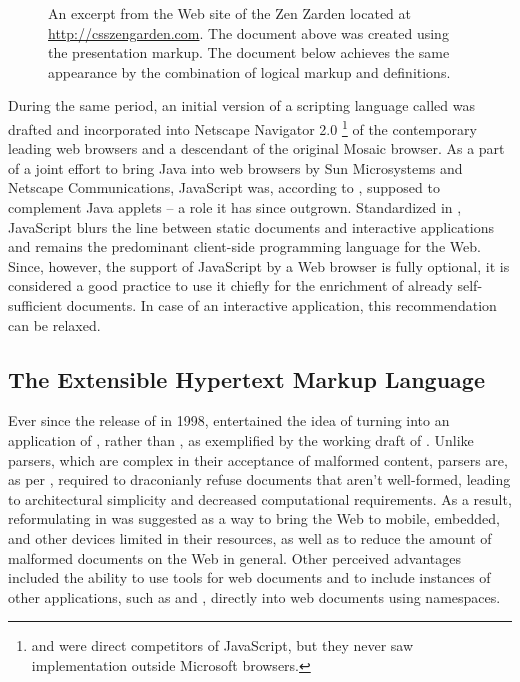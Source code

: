 \documentclass{book}
\begin{document}
\begin{figure}
  \inputminted{html}{examples/02/presentation-markup.html}
  \caption{An excerpt from the Web site of the  Zen Zarden
    located at \protect\url{http://csszengarden.com}. The document above was
    created using the  presentation markup. The document below
    achieves the same appearance by the combination of logical markup and
     definitions.}\bigskip
  \inputminted{html}{examples/02/logical-markup.html}
\end{figure}

During the same period, an initial version of a scripting language called
 was drafted and incorporated into Netscape Navigator 2.0%
\footnote{
   and  were direct competitors of JavaScript, but
  they never saw implementation outside Microsoft browsers.
} of the contemporary leading web browsers and a descendant of the original
Mosaic browser. As a part of a joint effort to bring Java into web browsers by
Sun Microsystems and Netscape Communications, JavaScript was, according to
\cite{js-announcement}, supposed to complement Java applets -- a role it has
since outgrown. Standardized in \cite{ecma1}, JavaScript blurs the line between
static documents and interactive applications and remains the predominant
client-side programming language for the Web. Since, however, the support of
JavaScript by a Web browser is fully optional, it is considered a good practice
to use it chiefly for the enrichment of already self-sufficient 
documents. In case of an interactive application, this recommendation can be
relaxed.

\subsection{The Extensible Hypertext Markup Language}
Ever since the release of  in 1998,  entertained the
idea of turning  into an application of , rather than
, as exemplified by the working draft of \cite{raggett98}. Unlike
 parsers, which are complex in their acceptance of malformed
content,  parsers are, as per \cite[Section~1.2,
Terminology]{bray98}, required to draconianly refuse  documents
that aren't well-formed, leading to architectural simplicity and decreased
computational requirements. As a result, reformulating  in
 was suggested as a way to bring the Web to mobile, embedded, and
other devices limited in their resources, as well as to reduce the amount of
malformed documents on the Web in general. Other perceived advantages included
the ability to use  tools for web documents and to include
instances of other  applications, such as  and
, directly into web documents using  namespaces.
\end{document}
